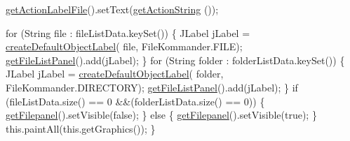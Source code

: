 \begin{DoxyCode}
        \hyperlink{classcom_1_1poly_1_1nlp_1_1filekommander_1_1views_1_1panels_1_1_abstract_file_folder_panel_a5604a494d100a6d78750a985cfe0b340}{getActionLabelFile}().setText(\hyperlink{classcom_1_1poly_1_1nlp_1_1filekommander_1_1views_1_1panels_1_1_abstract_file_folder_panel_aff16d223c2bdcd122ef6f74d1827f05f}{getActionString}
      ());

        \textcolor{keywordflow}{for} (String file : fileListData.keySet()) \{
            JLabel jLabel = \hyperlink{classcom_1_1poly_1_1nlp_1_1filekommander_1_1views_1_1panels_1_1_abstract_file_folder_panel_a20975a6589130de0b99c932b695f7ce5}{createDefaultObjectLabel}(
      file, FileKommander.FILE);
            \hyperlink{classcom_1_1poly_1_1nlp_1_1filekommander_1_1views_1_1panels_1_1_abstract_file_folder_panel_a65b9fd5b80a3d0d19afa10cfbfa3304e}{getFileListPanel}().add(jLabel);
        \}
        \textcolor{keywordflow}{for} (String folder : folderListData.keySet()) \{
            JLabel jLabel = \hyperlink{classcom_1_1poly_1_1nlp_1_1filekommander_1_1views_1_1panels_1_1_abstract_file_folder_panel_a20975a6589130de0b99c932b695f7ce5}{createDefaultObjectLabel}(
      folder,
                    FileKommander.DIRECTORY);
            \hyperlink{classcom_1_1poly_1_1nlp_1_1filekommander_1_1views_1_1panels_1_1_abstract_file_folder_panel_a65b9fd5b80a3d0d19afa10cfbfa3304e}{getFileListPanel}().add(jLabel);
        \}
        \textcolor{keywordflow}{if} (fileListData.size() == 0 &&(folderListData.size() == 0)) \{
            \hyperlink{classcom_1_1poly_1_1nlp_1_1filekommander_1_1views_1_1panels_1_1_abstract_file_folder_panel_ab551ed106b53e4bfaddc438b918be406}{getFilepanel}().setVisible(\textcolor{keyword}{false});
        \} \textcolor{keywordflow}{else} \{
            \hyperlink{classcom_1_1poly_1_1nlp_1_1filekommander_1_1views_1_1panels_1_1_abstract_file_folder_panel_ab551ed106b53e4bfaddc438b918be406}{getFilepanel}().setVisible(\textcolor{keyword}{true}); 
        \}
        this.paintAll(this.getGraphics());      
    \}
\end{DoxyCode}
